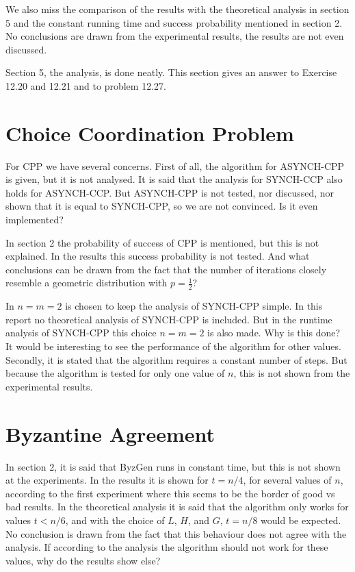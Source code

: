 \documentclass[nocopyrightspace]{acm_proc_article-sp}
\begin{document}
We also miss the comparison of the results with the theoretical analysis in section 5 and the constant running time and success probability mentioned in section 2. No conclusions are drawn from the experimental results, the results are not even discussed. 

Section 5, the analysis, is done neatly. This section gives an answer to Exercise 12.20 and 12.21 and to problem 12.27.

\section{Choice Coordination Problem}
For CPP we have several concerns. First of all, the algorithm for ASYNCH-CPP is given, but it is not analysed. It is said that the analysis for SYNCH-CCP also holds for ASYNCH-CCP. But ASYNCH-CPP is not tested, nor discussed, nor shown that it is equal to SYNCH-CPP, so we are not convinced. Is it even implemented? 

In section 2 the probability of success of CPP is mentioned, but this is not explained. In the results this success probability is not tested. And what conclusions can be drawn from the fact that the number of iterations closely resemble a geometric distribution with $p=\frac{1}{2}$?

In \cite{motwani2010randomized} $n=m=2$ is chosen to keep the analysis of SYNCH-CPP simple. In this report no theoretical analysis of SYNCH-CPP is included. But in the runtime analysis of SYNCH-CPP this choice $n=m=2$ is also made. Why is this done? It would be interesting to see the performance of the algorithm for other values. Secondly, it is stated that the algorithm requires a constant number of steps. But because the algorithm is tested for only one value of $n$, this is not shown from the experimental results. 

\section{Byzantine Agreement}
In section 2, it is said that ByzGen runs in constant time, but this is not shown at the experiments. In the results it is shown for $t=n/4$, for several values of $n$, according to the first experiment where this seems to be the border of good vs bad results. In the theoretical analysis it is said that the algorithm only works for values $t<n/6$, and with the choice of $L$, $H$, and $G$, $t=n/8$ would be expected. No conclusion is drawn from the fact that this behaviour does not agree with the analysis. If according to the analysis the algorithm should not work for these values, why do the results show else?
\end{document}
